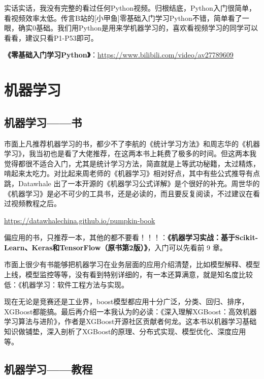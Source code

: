 \documentclass[]{ctexbook}
\begin{document}
实话实话，我没有完整的看过任何Python视频。归根结底，Python入门很简单，看视频效率太低。传言B站的{[}小甲鱼{]}零基础入门学习Python不错，简单看了一眼，确实0基础。我们用Python是用来学机器学习的，喜欢看视频学习的同学可以看看，建议只看P1-P53即可。

\textbf{《零基础入门学习Python》}：\url{https://www.bilibili.com/video/av27789609}

\hypertarget{ux673aux5668ux5b66ux4e60}{%
\section{机器学习}\label{ux673aux5668ux5b66ux4e60}}

\hypertarget{ux673aux5668ux5b66ux4e60ux4e66}{%
\subsection{机器学习------书}\label{ux673aux5668ux5b66ux4e60ux4e66}}

市面上凡推荐机器学习的书，都少不了李航的《统计学习方法》和周志华的《机器学习》，我当初也是看了大佬推荐，在这两本书上耗费了极多的时间。但这两本我觉得都很不适合入门，尤其是统计学习方法，简直就是上等武功秘籍，太过精炼，啃起来太吃力。对比起来周老师的《机器学习》相对好点，其中有些公式推导有点跳，Datawhale 出了一本开源的《机器学习公式详解》是个很好的补充。周世华的《机器学习》是必不可少的工具书，还是必读的，而且要反复阅读，不过建议在看过视频教程之后。

\url{https://datawhalechina.github.io/pumpkin-book}

偏应用的书，只推荐一本，其他的都不要看！！！：\textbf{《机器学习实战：基于Scikit-Learn、Keras和TensorFlow（原书第2版）》}，入门可以先看前 9 章。

市面上很少有书能够把机器学习在业务层面的应用介绍清楚，比如模型解释、模型上线，模型监控等等，没有看到特别详细的，有一本还算满意，就是知名度比较低：《机器学习：软件工程方法与实现。

现在无论是竞赛还是工业界，boost模型都应用十分广泛，分类、回归、排序，XGBoost都能搞。最后再介绍一本我认为的必读：《深入理解XGBoost：高效机器学习算法与进阶》，作者是XGBoost开源社区贡献者何龙。这本书以机器学习基础知识做铺垫，深入剖析了XGBoost的原理、分布式实现、模型优化、深度应用等。

\hypertarget{ux673aux5668ux5b66ux4e60ux6559ux7a0b}{%
\subsection{机器学习------教程}\label{ux673aux5668ux5b66ux4e60ux6559ux7a0b}}
\end{document}
